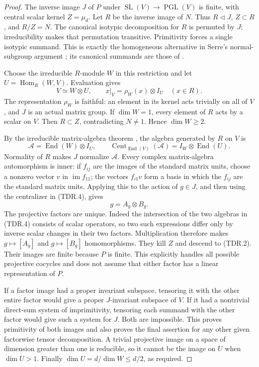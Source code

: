 \begin{proof}
The inverse image $J$ of $P$ under
$\operatorname{SL}(V)\to\operatorname{PGL}(V)$ is finite, with
central scalar kernel $Z=\mu_d$.  Let $R$ be the inverse image of
$N$.  Thus $R\triangleleft J$, $Z\subset R$, and $R/Z=N$.
The canonical isotypic decomposition for $R$ is permuted by $J$;
irreducibility makes that permutation transitive.  Primitivity
forces a single isotypic summand.  This is exactly the homogeneous
alternative in Serre's normal-subgroup argument
\cite[Section~8.1, Proposition~24 and proof, p.~61]{OG:Serre1977};
its canonical summands are those of
\cite[Section~2.6, Theorem~8, p.~21]{OG:Serre1977}.

Choose the irreducible $R$-module $W$ in this restriction and let
$U=\operatorname{Hom}_R(W,V)$.  Evaluation gives
\[
 V\simeq W\otimes U,\qquad
 x|_V=\rho_W(x)\otimes I_U\quad(x\in R).
 \tag{TDR.3}
\]
The representation $\rho_W$ is faithful: an element in its kernel
acts trivially on all of $V$, and $J$ is an actual matrix group.
If $\dim W=1$, every element of $R$ acts by a scalar on $V$.
Then $R\subset Z$, contradicting $N\ne1$.  Hence $\dim W\ge2$.

By the irreducible matrix-algebra theorem
\cite[Section~6.2, Proposition~10 and proof, p.~48]{OG:Serre1977},
the algebra generated by $R$ on $V$ is
\[
 \mathcal A=\operatorname{End}(W)\otimes I_U,
 \qquad
 \operatorname{Cent}_{\operatorname{End}(V)}(\mathcal A)
       =I_W\otimes\operatorname{End}(U).
 \tag{TDR.4}
\]
Normality of $R$ makes $J$ normalize $\mathcal A$.  Every complex
matrix-algebra automorphism is inner: if $f_{ij}$ are the images
of the standard matrix units, choose a nonzero vector $v$ in
$\operatorname{im}f_{11}$; the vectors $f_{i1}v$ form a basis
in which the $f_{ij}$ are the standard matrix units.  Applying this
to the action of $g\in J$, and then using the centralizer in
(TDR.4), gives
\[
                         g=A_g\otimes B_g.
 \tag{TDR.5}
\]
The projective factors are unique.  Indeed the intersection of
the two algebras in (TDR.4) consists of scalar operators, so two
such expressions differ only by inverse scalar changes in their
two factors.  Multiplication therefore makes
$g\mapsto[A_g]$ and $g\mapsto[B_g]$ homomorphisms.  They kill
$Z$ and descend to (TDR.2).  Their images are finite because $P$
is finite.  This explicitly handles all possible projective
cocycles and does not assume that either factor has a linear
representation of $P$.

If a factor image had a proper invariant subspace, tensoring it
with the other entire factor would give a proper $J$-invariant
subspace of $V$.  If it had a nontrivial direct-sum system of
imprimitivity, tensoring each summand with the other factor would
give such a system for $J$.  Both are impossible.  This proves
primitivity of both images and also proves the final assertion
for any other given factorwise tensor decomposition.  A trivial
projective image on a space of dimension greater than one is
reducible, so it cannot be the image on $U$ when $\dim U>1$.
Finally $\dim U=d/\dim W\le d/2$, as required.
\end{proof}

